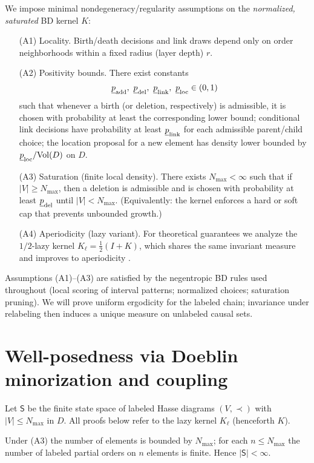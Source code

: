 We impose minimal nondegeneracy/regularity assumptions on the \emph{normalized, saturated} BD kernel $K$:
\begin{itemize}
\item[(A1) Locality.] Birth/death decisions and link draws depend only on order neighborhoods within a fixed radius (layer depth) $r$.
\item[(A2) Positivity bounds.] There exist constants
\[
\underline{p}_{\rm add},\ \underline{p}_{\rm del},\ \underline{p}_{\rm link},\ \underline{p}_{\rm loc}\in(0,1)
\]
such that whenever a birth (or deletion, respectively) is admissible, it is chosen with probability at least the corresponding lower bound; conditional link decisions have probability at least $\underline{p}_{\rm link}$ for each admissible parent/child choice; the location proposal for a new element has density lower bounded by $\underline{p}_{\rm loc}/\mathrm{Vol}(D)$ on $D$.
\item[(A3) Saturation (finite local density).] There exists $N_{\max}<\infty$ such that if $|V|\ge N_{\max}$, then a deletion is admissible and is chosen with probability at least $\underline{p}_{\rm del}$ until $|V|<N_{\max}$. (Equivalently: the kernel enforces a hard or soft cap that prevents unbounded growth.)
\item[(A4) Aperiodicity (lazy variant).] For theoretical guarantees we analyze the $1/2$-lazy kernel $K_\ell=\tfrac12(I+K)$, which shares the same invariant measure and improves to aperiodicity \cite{LevinPeresWilmer2009}.
\end{itemize}
Assumptions (A1)--(A3) are satisfied by the negentropic BD rules used throughout (local scoring of interval patterns; normalized choices; saturation pruning). We will prove uniform ergodicity for the labeled chain; invariance under relabeling then induces a unique measure on unlabeled causal sets.

\section{Well-posedness via Doeblin minorization and coupling}
Let $\mathsf{S}$ be the finite state space of labeled Hasse diagrams $(V,\prec)$ with $|V|\le N_{\max}$ in $D$. All proofs below refer to the lazy kernel $K_\ell$ (henceforth $K$).

\begin{lemma}\label{lem:finite}
Under (A3) the number of elements is bounded by $N_{\max}$; for each $n\le N_{\max}$ the number of labeled partial orders on $n$ elements is finite. Hence $|\mathsf{S}|<\infty$.
\end{lemma}

